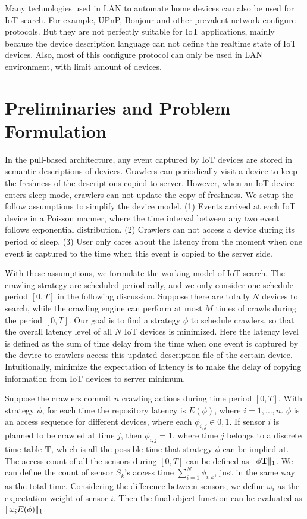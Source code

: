 \documentclass[conference]{IEEEtran}
\begin{document}
Many technologies used in LAN to automate home devices can also be used for IoT search. For example, UPnP\cite{UPnP}, Bonjour\cite{Bonjour} and other prevalent network configure protocols. But they are not perfectly suitable for IoT applications, mainly because the device description language can not define the realtime state of IoT devices. Also, most of this configure protocol can only be used in LAN environment, with limit amount of devices.

\section{Preliminaries and Problem Formulation}
In the pull-based architecture, any event captured by IoT devices are stored in semantic descriptions of devices. Crawlers can periodically visit a device to keep the freshness of the descriptions copied to server. However, when an IoT device enters sleep mode, crawlers can not update the copy of freshness. We setup the follow assumptions to simplify the device model. (1) Events arrived at each IoT device in a Poisson manner, where the time interval between any two event follows exponential distribution. (2) Crawlers can not access a device during its period of sleep. (3) User only cares about the latency from the moment when one event is captured to the time when this event is copied to the server side. 


With these assumptions, we formulate the working model of IoT search. The crawling strategy are scheduled periodically, and we only consider one schedule period $[0, T]$ in the following discussion. Suppose there are totally $N$ devices to search, while the crawling engine can perform at most $M$ times of crawls during the period $[0, T]$. Our goal is to find a strategy $\phi$ to schedule crawlers, so that the overall latency level of all $N$ IoT devices is minimized.
Here the latency level is defined as the sum of time delay from the time when one event is captured by the device to crawlers access this updated description file of the certain device. Intuitionally, minimize the expectation of latency is to make the delay of copying information from IoT devices to server minimum. 


Suppose the crawlers commit $n$ crawling actions during time period $[0, T]$. With strategy $\phi$, for each time the repository latency is $E(\phi)$, where $i=1,\ldots,n$. 
$\phi$ is an access sequence for different devices, where each $\phi_{i,j}\in{0,1}$. If sensor $i$ is planned to be crawled at time $j$, then $\phi_{i,j}=1$, where time $j$ belongs to a discrete time table $\mathbf{T}$, which is all the possible time that strategy $\phi$ can be implied at.
The access count of all the sensors during $[0, T]$ can be defined as $\Arrowvert\phi\mathbf{T} \Arrowvert_{1}$. We can define the count of sensor $S_k$'s access time $\sum_{i=1}^{N}\phi_{i,k}$, just in the same way as the total time. 
Considering the difference between sensors, we define $\omega_i$ as the expectation weight of sensor $i$. Then the final object function can be evaluated as $\Arrowvert \omega_i E(\phi) \Arrowvert_{1}$.
\end{document}
